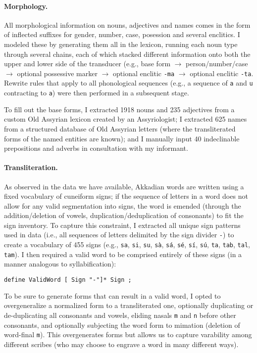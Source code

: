 \documentclass[11pt,letterpaper]{article}
\begin{document}
\paragraph{Morphology.}All morphological information on nouns, adjectives and names comes in the form of inflected suffixes for gender, number, case, posession and several enclitics.  I modeled these by generating them all in the lexicon, running each noun type through several chains, each of which stacked different information onto both the upper and lower side of the transducer (e.g., base form $\rightarrow$ person/number/case $\rightarrow$ optional possessive marker $\rightarrow$ optional enclitic \texttt{-ma} $\rightarrow$ optional enclitic \texttt{-ta}.  Rewrite rules that apply to all phonological sequences (e.g., a sequence of \texttt{a} and \texttt{u} contracting to \texttt{a}) were then performed in a subsequent stage.

To fill out the base forms, I extracted 1918 nouns and 235 adjectives from a custom Old Assyrian lexicon created by an Assyriologist; I extracted 625 names from a structured database of Old Assyrian letters (where the transliterated forms of the named entities are known); and I manually input 40 indeclinable prepositions and adverbs in consultation with my informant.

\paragraph{Transliteration.} As observed in the data we have available, Akkadian words are written using a fixed vocabulary of cuneiform signs; if the sequence of letters in a word does not allow for any valid segmentation into signs, the word is emended (through the addition/deletion of vowels, duplication/deduplication of consonants) to fit the sign inventory.  To capture this constraint, I extracted all unique sign patterns used in data (i.e., all sequences of letters delimited by the sign divider \texttt{-}) to create a vocabulary of 455 signs (e.g., \texttt{sa}, \texttt{si}, \texttt{su}, \texttt{sà}, \texttt{sá}, \texttt{sé}, \texttt{sí}, \texttt{sú}, \texttt{ta}, \texttt{tab}, \texttt{tal}, \texttt{tam}).  I then required a valid word to be comprised entirely of these signs (in a manner analogous to syllabification):

\begin{verbatim}
define ValidWord [ Sign "-"]* Sign ;
\end{verbatim}

To be sure to generate forms that can result in a valid word, I opted to overgeneralize a normalized form to a transliterated one, optionally duplicating or de-duplicating all consonants and vowels, eliding nasals \texttt{m} and \texttt{n} before other consonants, and optionally subjecting the word form to mimation (deletion of word-final \texttt{m}).  This overgenerates forms but allows us to capture varability among different scribes (who may choose to engrave a word in many different ways).
\end{document}
